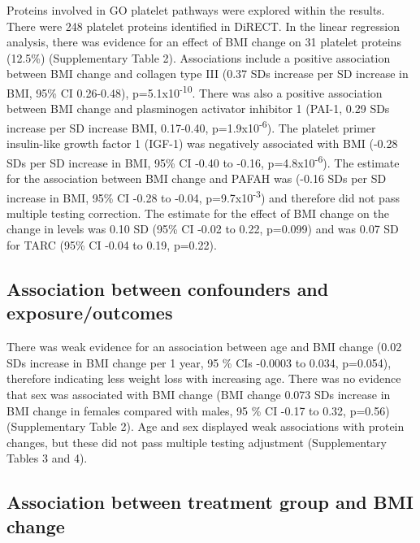 \documentclass[11pt,twoside]{bristolthesis}
\begin{document}
Proteins involved in GO platelet pathways were explored within the results. There were 248 platelet proteins identified in DiRECT. In the linear regression analysis, there was evidence for an effect of BMI change on 31 platelet proteins (12.5\%) (Supplementary Table 2). Associations include a positive association between BMI change and collagen type III (0.37 SDs increase per SD increase in BMI, 95\% CI 0.26-0.48), p=5.1x10\textsuperscript{-10}. There was also a positive association between BMI change and plasminogen activator inhibitor 1 (PAI-1, 0.29 SDs increase per SD increase BMI, 0.17-0.40, p=1.9x10\textsuperscript{-6}). The platelet primer insulin-like growth factor 1 (IGF-1) was negatively associated with BMI (-0.28 SDs per SD increase in BMI, 95\% CI -0.40 to -0.16, p=4.8x10\textsuperscript{-6}). The estimate for the association between BMI change and PAFAH was (-0.16 SDs per SD increase in BMI, 95\% CI -0.28 to -0.04, p=9.7x10\textsuperscript{-3}) and therefore did not pass multiple testing correction. The estimate for the effect of BMI change on the change in levels was 0.10 SD (95\% CI -0.02 to 0.22, p=0.099) and was 0.07 SD for TARC (95\% CI -0.04 to 0.19, p=0.22).

\hypertarget{association-between-confounders-and-exposureoutcomes}{%
\subsection{Association between confounders and exposure/outcomes}\label{association-between-confounders-and-exposureoutcomes}}

There was weak evidence for an association between age and BMI change (0.02 SDs increase in BMI change per 1 year, 95 \% CIs -0.0003 to 0.034, p=0.054), therefore indicating less weight loss with increasing age. There was no evidence that sex was associated with BMI change (BMI change 0.073 SDs increase in BMI change in females compared with males, 95 \% CI -0.17 to 0.32, p=0.56) (Supplementary Table 2). Age and sex displayed weak associations with protein changes, but these did not pass multiple testing adjustment (Supplementary Tables 3 and 4).

\hypertarget{association-between-treatment-group-and-bmi-change}{%
\subsection{Association between treatment group and BMI change}\label{association-between-treatment-group-and-bmi-change}}
\end{document}
